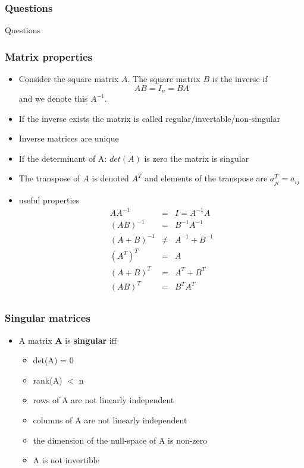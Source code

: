 \documentclass[10pt]{beamer}
\begin{document}
\begin{frame}
  \frametitle{Questions}
  \centerline{\Huge Questions}
\end{frame}

\begin{frame}
  \frametitle{Matrix properties}
  \begin{itemize}
  \item Consider the square matrix $A$. The square matrix $B$ is the inverse if
    \[ AB = I_n = BA \]
    and we denote this $A^{-1}$.
  \item If the inverse exists the matrix is called regular/invertable/non-singular
  \item Inverse matrices are unique
  \item If the determinant of A: $det(A)$ is zero the matrix is singular
  \item The transpose of $A$ is denoted $A^T$ and elements of the transpose are $a^T_{ji} = a_{ij}$
  \item useful properties
    \[
      \begin{array}{ccc}
        AA^{-1}  & = & I = A^{-1}A\\
        (AB)^{-1} & = & B^{-1} A^{-1}\\
        (A+B)^{-1} & \neq & A^{-1} + B^{-1}\\
        (A^T)^T  & = & A \\
        (A+B)^T &= & A^T + B^T \\
        (AB)^T &=& B^T A^T \\
      \end{array}
    \]
  \end{itemize}
\end{frame}

\begin{frame}
  \frametitle{Singular matrices}
  \begin{itemize}
  \item A matrix $\mathbf{A}$ is {\bf singular} iff
    \begin{itemize}
    \item det(A) = 0
    \item rank(A) $<$ n
    \item rows of A are not linearly independent
    \item columns of A are not linearly independent
    \item the dimension of the null-space of A is non-zero
    \item A is not invertible
    \end{itemize}
  \end{itemize}
\end{frame}
\end{document}
